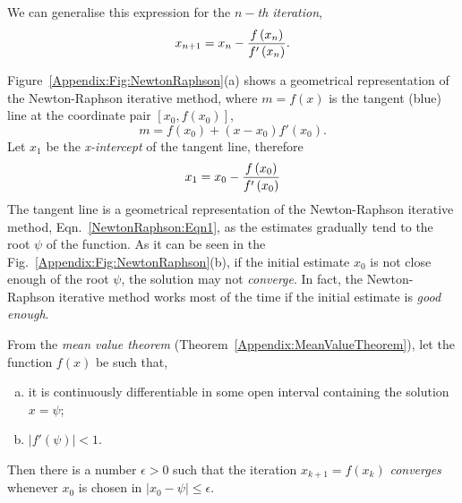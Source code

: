    \begin{shaded}
      We can generalise this expression for the $n-${\it th iteration},
         \begin{equation}
            x_{n+1} = x_{n} -\displaystyle\frac{f\left(x_{n}\right)}{f'\left(x_{n}\right)}.\label{NewtonRaphson:Eqn1}
         \end{equation}
   \end{shaded}

Figure~\ref{Appendix:Fig:NewtonRaphson}(a) shows a geometrical representation of the Newton-Raphson iterative method, where $m=f(x)$ is the tangent (blue) line at the coordinate pair $\left[x_{0},f\left(x_{0}\right)\right]$,
   \begin{displaymath}
     m = f\left(x_{0}\right) + \left(x-x_{0}\right)f'\left(x_{0}\right).
   \end{displaymath}
Let $x_{1}$ be the {\it x-intercept} of the tangent line, therefore
   \begin{displaymath}
     x_{1} = x_{0} - \displaystyle\frac{f\left(x_{0}\right)}{f'\left(x_{0}\right)}
   \end{displaymath}
The tangent line is a geometrical representation of the Newton-Raphson iterative method, Eqn.~\ref{NewtonRaphson:Eqn1}, as the estimates gradually tend to the root $\psi$ of the function. As it can be seen in the Fig.~\ref{Appendix:Fig:NewtonRaphson}(b), if the initial estimate $x_{0}$ is not close enough of the root $\psi$, the solution may not {\it converge}. In fact, the Newton-Raphson iterative method works most of the time if the initial estimate is {\it good enough}.

 From the {\it mean value theorem} (Theorem~\ref{Appendix:MeanValueTheorem}), let the function $f(x)$ be such that, 
   \begin{enumerate}[(a)]
      \item it is continuously differentiable in some open interval containing the solution $x=\psi$;
      \item $\left|f'(\psi)\right| < 1$.
   \end{enumerate}
Then there is a number $\epsilon > 0$ such that the iteration $x_{k+1}=f\left(x_{k}\right)$ {\it converges} whenever $x_{0}$ is chosen in $\left|x_{0}-\psi\right|\leq\epsilon$.

